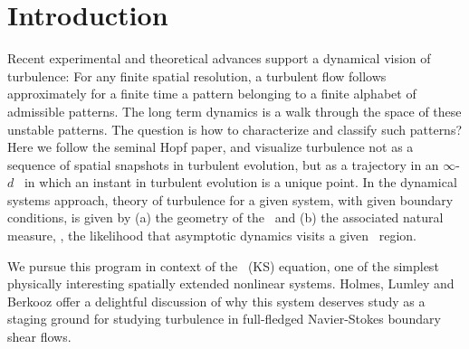 
\section{Introduction}

Recent experimental and theoretical advances
support a dynamical vision of turbulence:
For any finite  spatial resolution,
a turbulent flow follows approximately for a finite time
a pattern belonging to a
{ finite alphabet}
of admissible patterns.
The long term dynamics is
a {walk through the space of these unstable patterns}.
The question is how to characterize and classify such patterns?
Here we follow the seminal Hopf paper, and  visualize
turbulence not as  a sequence of
spatial snapshots in turbulent evolution,
but as a trajectory in an
 $\infty$-$d$ \statesp\ in which an
instant in turbulent evolution is
a {unique} point. In the dynamical systems approach,
theory of turbulence for a given system, with given boundary conditions,
is given by
(a) the geometry of the \statesp\ and (b) the associated natural measure,
\ie,
the likelihood that asymptotic dynamics visits a given \statesp\ region.

We pursue this program in context of the \KS\ (KS) equation,
one of the simplest physically interesting spatially extended
nonlinear systems.  Holmes, Lumley and Berkooz offer a
delightful discussion of why this system deserves study as a staging
ground for studying turbulence in full-fledged Navier-Stokes
boundary shear flows.

